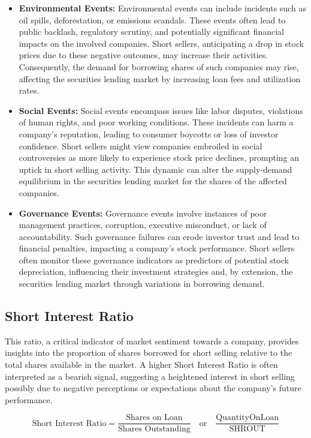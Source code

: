 \begin{itemize}
	\item\textbf{Environmental Events:} Environmental events can include incidents such as oil spills, deforestation, or emissions scandals. These events often lead to public backlash, regulatory scrutiny, and potentially significant financial impacts on the involved companies. Short sellers, anticipating a drop in stock prices due to these negative outcomes, may increase their activities. Consequently, the demand for borrowing shares of such companies may rise, affecting the securities lending market by increasing loan fees and utilization rates.
	\item\textbf{Social Events:} Social events encompass issues like labor disputes, violations of human rights, and poor working conditions. These incidents can harm a company's reputation, leading to consumer boycotts or loss of investor confidence. Short sellers might view companies embroiled in social controversies as more likely to experience stock price declines, prompting an uptick in short selling activity. This dynamic can alter the supply-demand equilibrium in the securities lending market for the shares of the affected companies.
	\item\textbf{Governance Events:} Governance events involve instances of poor management practices, corruption, executive misconduct, or lack of accountability. Such governance failures can erode investor trust and lead to financial penalties, impacting a company's stock performance. Short sellers often monitor these governance indicators as predictors of potential stock depreciation, influencing their investment strategies and, by extension, the securities lending market through variations in borrowing demand.
\end{itemize}

\subsection{Short Interest Ratio}

This ratio, a critical indicator of market sentiment towards a company, provides insights into the proportion of shares borrowed for short selling relative to the total shares available in the market. A higher Short Interest Ratio is often interpreted as a bearish signal, suggesting a heightened interest in short selling possibly due to negative perceptions or expectations about the company's future performance.

 \begin{equation}
	\text{Short Interest Ratio} = \frac{\text{Shares on Loan}}{\text{Shares Outstanding}} \quad \text{or} \quad \frac{\text{QuantityOnLoan}}{\text{SHROUT}}
	\label{eq:Short_Interest_Ratio}
\end{equation}


